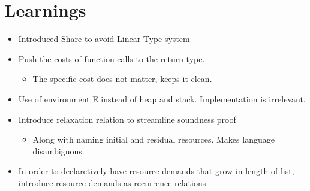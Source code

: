 \chapter{Learnings}
\begin{itemize}
	\item Introduced Share to avoid Linear Type system
	\item Push the costs of function calls to the return type. 
	   \begin{itemize}
	   	\item The specific cost does not matter, keeps it clean.
	   \end{itemize}
	\item Use of environment E instead of heap and stack. Implementation is irrelevant.
	\item Introduce relaxation relation to streamline soundness proof
	\begin{itemize}
		\item Along with naming initial and residual resources. Makes language disambiguous.
	\end{itemize}
	\item In order to declaretively have resource demands that grow in length of list, introduce resource demands as recurrence relations

\end{itemize}
